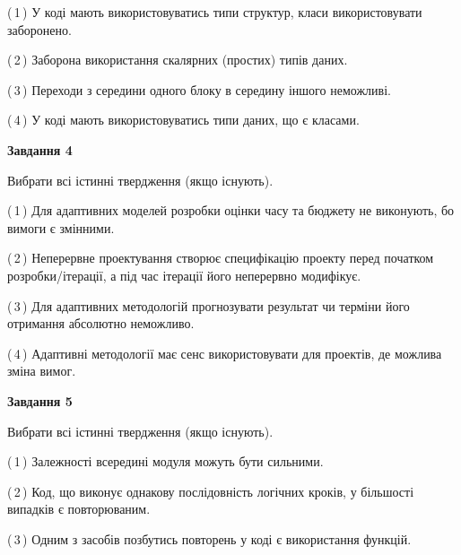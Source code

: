 \documentclass[10pt, ukrainian]{article}
\begin{document}
{\begin {large}
(\,1\,) У коді мають використовуватись типи структур, класи використовувати заборонено. %



(\,2\,) Заборона використання скалярних (простих) типів даних. %



(\,3\,) Переходи з середини одного блоку в середину іншого неможливі. %



(\,4\,) У коді мають використовуватись типи даних, що є класами. %


{\begin {center}\textbf{Завдання 4}\end {center}}\par
Вибрати всі істинні твердження (якщо існують).\par
\vspace{2mm}



(\,1\,) Для адаптивних моделей розробки оцінки часу та бюджету не виконують, бо вимоги є змінними. %



(\,2\,) Неперервне проектування створює специфікацію проекту перед початком розробки/ітерації, а під час ітерації його неперервно модифікує.%



(\,3\,) Для адаптивних методологій прогнозувати результат чи терміни його отримання абсолютно неможливо. %



(\,4\,) Адаптивні методології має сенс використовувати для проектів, де можлива зміна вимог. %


{\begin {center}\textbf{Завдання 5}\end {center}}\par
Вибрати всі істинні твердження (якщо існують).\par
\vspace{2mm}



(\,1\,) Залежності всередині модуля можуть бути сильними. %



(\,2\,) Код, що виконує однакову послідовність логічних кроків, у більшості випадків є повторюваним.%



(\,3\,) Одним з засобів позбутись повторень у коді є використання функцій. %




\end{large}}
\end{document}
